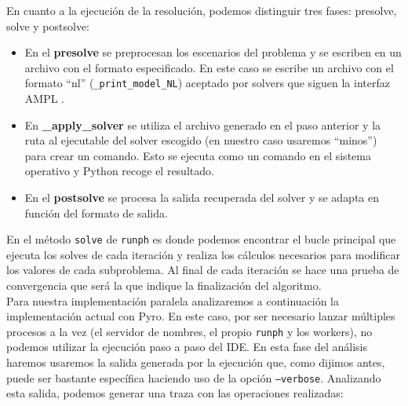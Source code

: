 En cuanto a la ejecución de la resolución, podemos distinguir tres fases: presolve, solve y postsolve:

\begin{itemize}
    \item En el \textbf{presolve} se preprocesan los escenarios del problema y se escriben en un archivo con el formato especificado. En este caso se escribe un archivo con el formato ``nl'' (\texttt{\_print\_model\_NL}) aceptado por solvers que siguen la interfaz AMPL \cite{AMPL}.
    \item En \textbf{\_apply\_solver} se utiliza el archivo generado en el paso anterior y la ruta al ejecutable del solver escogido (en nuestro caso usaremos ``minos'') para crear un comando. Esto se ejecuta como un comando en el sistema operativo y Python recoge el resultado.
    \item En el \textbf{postsolve} se procesa la salida recuperada del solver y se adapta en función del formato de salida.
\end{itemize}

En el método \texttt{solve} de \texttt{runph} es donde podemos encontrar el bucle principal que ejecuta los solves de cada iteración y realiza los cálculos necesarios para modificar los valores de cada subproblema. Al final de cada iteración se hace una prueba de convergencia que será la que indique la finalización del algoritmo.\\

Para nuestra implementación paralela analizaremos a continuación la implementación actual con Pyro. En este caso, por ser necesario lanzar múltiples procesos a la vez (el servidor de nombres, el propio \texttt{runph} y los workers), no podemos utilizar la ejecución paso a paso del IDE. En esta fase del análisis haremos usaremos la salida generada por la ejecución que, como dijimos antes, puede ser bastante específica haciendo uso de la opción \texttt{--verbose}. Analizando esta salida, podemos generar una traza con las operaciones realizadas:\\

